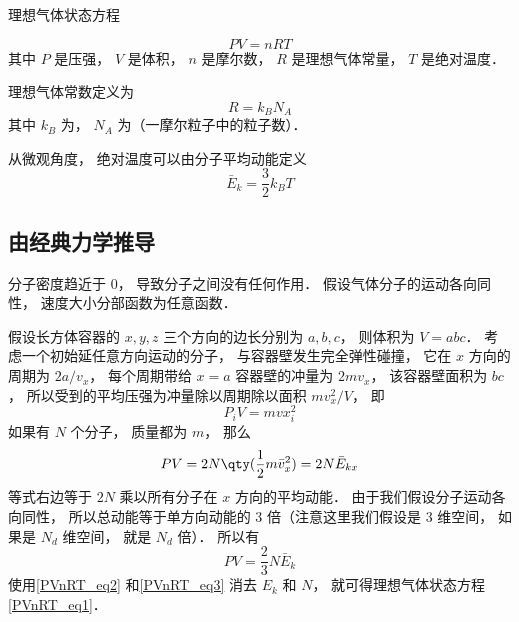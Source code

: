 
理想气体状态方程

\begin{equation}\label{PVnRT_eq1}
PV = nRT
\end{equation}
其中 $P$ 是压强， $V$ 是体积， $n$ 是摩尔数， $R$ 是理想气体常量， $T$ 是绝对温度．

理想气体常数定义为
\begin{equation}\label{PVnRT_eq2}
R = k_B N_A
\end{equation}
其中 $k_B$ 为， $N_A$ 为（一摩尔粒子中的粒子数）．

从微观角度， 绝对温度可以由分子平均动能定义
\begin{equation}\label{PVnRT_eq3}
\bar E_k = \frac32 k_B T
\end{equation}

\subsection{由经典力学推导}
分子密度趋近于 0， 导致分子之间没有任何作用． 假设气体分子的运动各向同性， 速度大小分部函数为任意函数．

假设长方体容器的 $x, y, z$ 三个方向的边长分别为 $a, b, c$， 则体积为  $V = abc$． 考虑一个初始延任意方向运动的分子， 与容器壁发生完全弹性碰撞， 它在 $x$ 方向的周期为 $2a/v_x$， 每个周期带给 $x = a$ 容器壁的冲量为 $2m v_x$， 该容器壁面积为 $bc$， 所以受到的平均压强为冲量除以周期除以面积 $mv_x^2/V$， 即
\begin{equation}
P_i V = mv x_i^2
\end{equation}
如果有 $N$ 个分子， 质量都为 $m$， 那么
\begin{equation}
P V = 2 N \qty(\frac12 m \bar v_x^2) = 2 N \bar E_{kx}
\end{equation}
等式右边等于 $2N$ 乘以所有分子在 $x$ 方向的平均动能． 由于我们假设分子运动各向同性， 所以总动能等于单方向动能的 3 倍（注意这里我们假设是 3 维空间， 如果是 $N_d$ 维空间， 就是 $N_d$ 倍）． 所以有
\begin{equation}
P V = \frac23 N \bar E_k
\end{equation}
使用\autoref{PVnRT_eq2} 和\autoref{PVnRT_eq3} 消去 $E_k$ 和 $N$， 就可得理想气体状态方程\autoref{PVnRT_eq1}．
